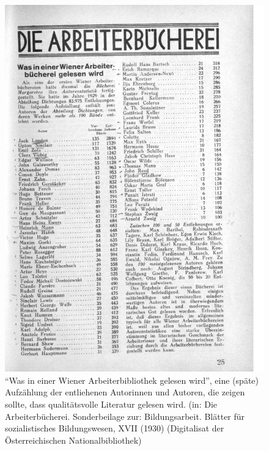 \documentclass[a4paper,
fontsize=11pt,
oneside,
numbers=noperiodatend,
parskip=half-,
bibliography=totoc,
final
]{scrartcl}
\begin{document}
\begin{figure}
\centering
\includegraphics[width=.9\textwidth]{img/Schuldt03.jpg}
\caption{\enquote{Was in einer Wiener Arbeiterbibliothek gelesen wird},
eine (späte) Aufzählung der entliehenen Autorinnen und Autoren, die
zeigen sollte, dass qualitätsvolle Literatur gelesen wird. (in: Die
Arbeiterbücherei. Sonderbeilage zur: Bildungsarbeit. Blätter für
sozialistisches Bildungswesen, XVII (1930) (Digitalisat der
Österreichischen Nationalbibliothek)}
\end{figure}
\end{document}
